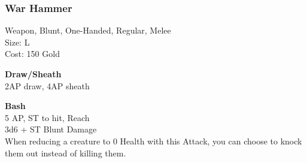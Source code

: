 \subsubsection{War Hammer}\label{weapon:warHammer}
Weapon, Blunt, One-Handed, Regular, Melee\\
Size: L\\
Cost: 150 Gold

\textbf{Draw/Sheath}\\
2AP draw, 4AP sheath

\textbf{Bash}\\
5 AP, ST to hit,  Reach\\
3d6 + \texttimes ST Blunt Damage\\
When reducing a creature to 0 Health with this Attack, you can choose to knock them out instead of killing them.